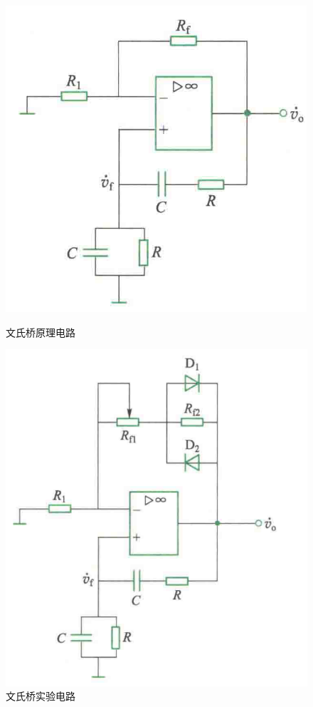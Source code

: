 \documentclass[10pt, a4paper]{article} %
\begin{document}
\begin{figure}[th]
    \centering
    \begin{minipage}{0.45\textwidth}
        \centering
        \includegraphics[width=\textwidth]{image/1.png}
        \caption{文氏桥原理电路}
        \label{fig:文氏桥原理电路}
    \end{minipage}
    \hfill
    \begin{minipage}{0.45\textwidth}
        \centering
        \includegraphics[width=\textwidth]{image/2.png}
        \caption{文氏桥实验电路}
        \label{fig:文氏桥实验电路}
    \end{minipage}
    
\end{figure}
\end{document}
